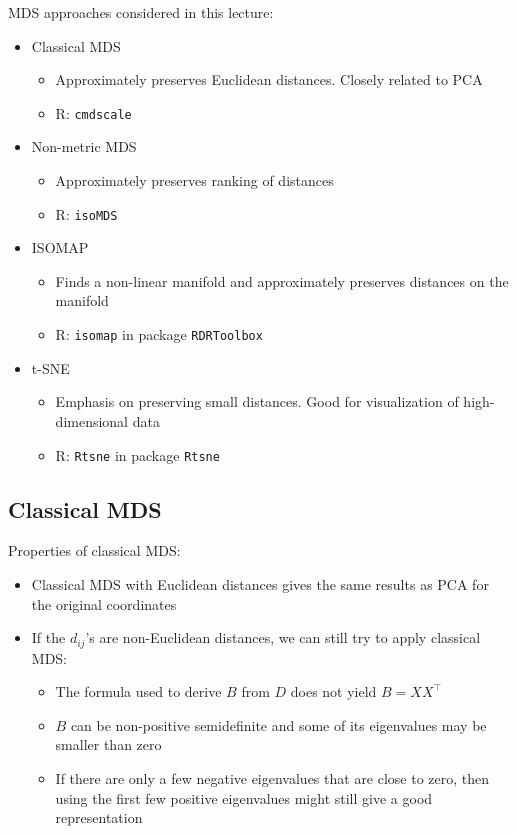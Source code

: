 \documentclass[a4paper]{article}
\begin{document}
MDS approaches considered in this lecture:
\begin{itemize}
    \item Classical MDS
    \begin{itemize}
        \item Approximately preserves Euclidean distances. Closely related to PCA
        \item R: \texttt{cmdscale}
    \end{itemize}
    \item Non-metric MDS
    \begin{itemize}
        \item Approximately preserves ranking of distances
        \item R: \texttt{isoMDS}
    \end{itemize}
    \item ISOMAP
    \begin{itemize}
        \item Finds a non-linear manifold and approximately preserves distances on the manifold
        \item R: \texttt{isomap} in package \texttt{RDRToolbox}
    \end{itemize}
    \item t-SNE
    \begin{itemize}
        \item Emphasis on preserving small distances. Good for visualization of high-dimensional data
        \item R: \texttt{Rtsne} in package \texttt{Rtsne}
    \end{itemize}
\end{itemize}

\subsection{Classical MDS}

Properties of classical MDS:
\begin{itemize}
    \item Classical MDS with Euclidean distances gives the same results as PCA for the original coordinates
    \item If the $d_{ij}$'s are non-Euclidean distances, we can still try to apply classical MDS:
    \begin{itemize}
        \item The formula used to derive $B$ from $D$ does not yield $B=XX^{\intercal}$
        \item $B$ can be non-positive semidefinite and some of its eigenvalues may be smaller than zero
        \item If there are only a few negative eigenvalues that are close to zero, then using the first few positive eigenvalues might still give a good representation
    \end{itemize}
\end{itemize}
\end{document}

